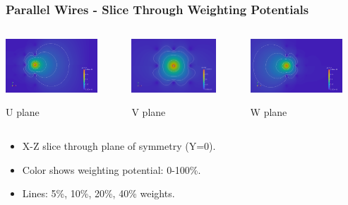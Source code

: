 \documentclass[xcolor=dvipsnames]{beamer}
\begin{document}
\begin{frame}
  \frametitle{Parallel Wires - Slice Through Weighting Potentials}
  \begin{columns}
    \begin{column}{0.3\textwidth}
      \begin{center}
        \includegraphics[height=2cm]{twodee-fine-u7.png}

        \scriptsize U plane
      \end{center}
    \end{column}
    \begin{column}{0.3\textwidth}
      \begin{center}
        \includegraphics[height=2cm]{twodee-fine-v7.png}
        
        \scriptsize V plane
      \end{center}
    \end{column}
    \begin{column}{0.3\textwidth}
      \begin{center}
        \includegraphics[height=2cm]{twodee-fine-w7.png}

        \scriptsize W plane
      \end{center}
    \end{column}
  \end{columns}

  \begin{itemize}\footnotesize
  \item X-Z slice through plane of symmetry (Y=0).
  \item Color shows weighting potential: 0-100\%.
  \item Lines: 5\%, 10\%, 20\%, 40\% weights.
  \end{itemize}

\end{frame}
\end{document}
